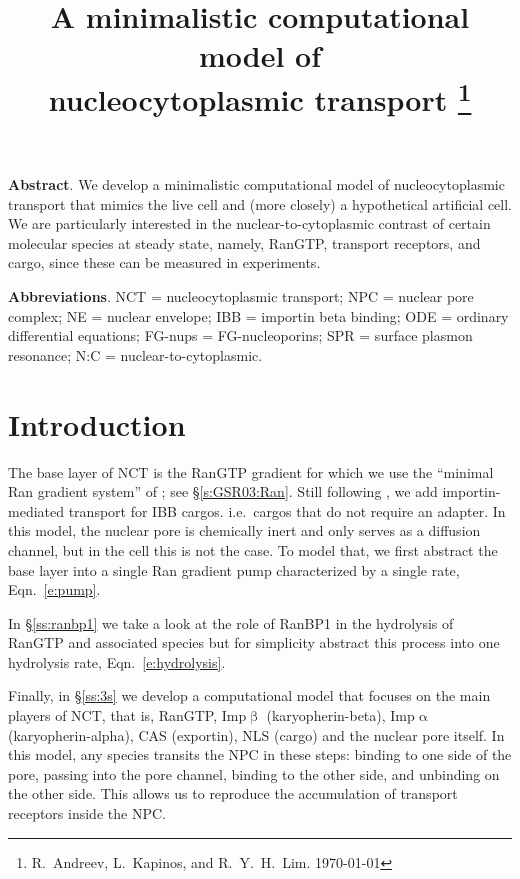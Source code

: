 \documentclass[12pt,notitlepage]{article}
\title{%
A minimalistic computational model of \\
nucleocytoplasmic transport%
\thanks{%
R.~Andreev, L.~Kapinos, and R.~Y.~H.~Lim.
\today
\hfill
\tiny\color{lightgray}\hfill{\DTMnow}
}}
\date{}
\begin{document}
\maketitle

{
\small
\textbf{Abstract}.
%
We develop a minimalistic computational
model of 
nucleocytoplasmic transport
that mimics
the live cell and (more closely) a hypothetical artificial cell.
%
%
We are particularly
interested in 
the nuclear-to-cytoplasmic contrast
of 
certain molecular species
at steady state,
namely,
RanGTP,
transport receptors,
and
cargo,
since these can be measured in experiments.
}


{
\small
\textbf{Abbreviations}.
%
NCT = nucleocytoplasmic transport;
NPC = nuclear pore complex;
NE = nuclear envelope;
IBB = importin beta binding; 
ODE = ordinary differential equations;
FG-nups = FG-nucleoporins;
SPR = surface plasmon resonance;
N:C = nuclear-to-cytoplasmic.
}

\section{Introduction}

%

The base layer of NCT is the RanGTP gradient
for which we use the ``minimal Ran gradient system''
of \cite{GoerlichSeewaldRibbeck2003};
see \S\ref{s:GSR03:Ran}.
%
%
Still following \cite{GoerlichSeewaldRibbeck2003},
we add importin-mediated transport 
for IBB cargos.
%
i.e.~cargos that do not require an adapter.
%
%
%
In this model,
the nuclear pore is chemically inert 
and only serves as a diffusion channel,
but in the cell this is not the case.
%
To model that,
we first abstract
the base layer into a single
Ran gradient pump characterized
by a single rate, Eqn.~\ref{e:pump}. 

%

In \S\ref{ss:ranbp1} we take a look at the role
of RanBP1
in the hydrolysis of RanGTP
and associated species
but
for simplicity
abstract this process into 
one hydrolysis rate, Eqn.~\eqref{e:hydrolysis}.

%

Finally, in \S\ref{ss:3s}
we develop 
a computational model
that focuses
on the main players of NCT,
that is,
{RanGTP},
{Imp$\upbeta$} (karyopherin-beta),
{Imp$\upalpha$} (karyopherin-alpha),
{CAS} (exportin),
{NLS} (cargo)
and
the nuclear pore itself.
%
%
%
In this model,
any species transits the NPC
in these steps:
binding to one side of the pore,
passing into the pore channel,
binding to the other side,
and unbinding on the other side.
%
%
This allows us
to reproduce the accumulation
of transport receptors
inside the NPC.
\end{document}
